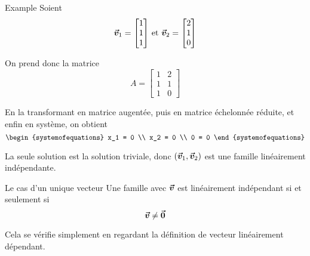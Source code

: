 \documentclass{article}
\begin{document}
\begin{parag}{Example}
    Soient 
    \[\bvec{v}_1 = \begin{bmatrix} 1 \\ 1 \\ 1 \end{bmatrix} \text{ et } \bvec{v}_2 = \begin{bmatrix} 2 \\ 1 \\ 0 \end{bmatrix} \]
    
    On prend donc la matrice 
    \[A = \begin{bmatrix} 1 & 2 \\ 1 & 1 \\ 1 & 0 \end{bmatrix} \]
    
    En la transformant en matrice augentée, puis en matrice échelonnée réduite, et enfin en système, on obtient 
    \[\begin{systemofequations}
    x_1 = 0 \\
    x_2 = 0 \\
    0 = 0
    \end{systemofequations}\]

    La seule solution est la solution triviale, donc $\left(\bvec{v}_1, \bvec{v}_2\right)$ est une famille linéairement indépendante.
\end{parag}

\begin{parag}{Le cas d'un unique vecteur}
    Une famille avec  $\bm{\protect\vec{v}}$ est linéairement indépendant si et seulement si 
    \[\bm{\protect\vec{v}} \neq \bm{\protect\vec{0}}\]

    Cela se vérifie simplement en regardant la définition de vecteur linéairement dépendant. 
\end{parag}
\end{document}

